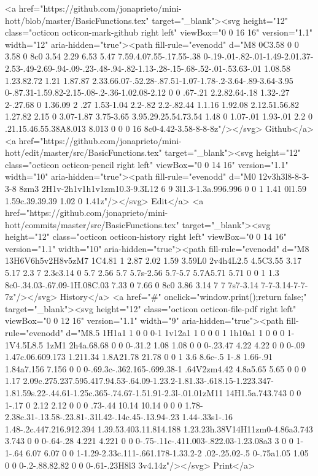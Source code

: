       <a href="https://github.com/jonaprieto/mini-hott/blob/master/BasicFunctions.tex" target="_blank"><svg height="12" class="octicon octicon-mark-github right left" viewBox="0 0 16 16" version="1.1" width="12" aria-hidden="true"><path fill-rule="evenodd" d="M8 0C3.58 0 0 3.58 0 8c0 3.54 2.29 6.53 5.47 7.59.4.07.55-.17.55-.38 0-.19-.01-.82-.01-1.49-2.01.37-2.53-.49-2.69-.94-.09-.23-.48-.94-.82-1.13-.28-.15-.68-.52-.01-.53.63-.01 1.08.58 1.23.82.72 1.21 1.87.87 2.33.66.07-.52.28-.87.51-1.07-1.78-.2-3.64-.89-3.64-3.95 0-.87.31-1.59.82-2.15-.08-.2-.36-1.02.08-2.12 0 0 .67-.21 2.2.82.64-.18 1.32-.27 2-.27.68 0 1.36.09 2 .27 1.53-1.04 2.2-.82 2.2-.82.44 1.1.16 1.92.08 2.12.51.56.82 1.27.82 2.15 0 3.07-1.87 3.75-3.65 3.95.29.25.54.73.54 1.48 0 1.07-.01 1.93-.01 2.2 0 .21.15.46.55.38A8.013 8.013 0 0 0 16 8c0-4.42-3.58-8-8-8z"/></svg> Github</a>
      <a href="https://github.com/jonaprieto/mini-hott/edit/master/src/BasicFunctions.tex" target="_blank"><svg height="12" class="octicon octicon-pencil right left" viewBox="0 0 14 16" version="1.1" width="10" aria-hidden="true"><path fill-rule="evenodd" d="M0 12v3h3l8-8-3-3-8 8zm3 2H1v-2h1v1h1v1zm10.3-9.3L12 6 9 3l1.3-1.3a.996.996 0 0 1 1.41 0l1.59 1.59c.39.39.39 1.02 0 1.41z"/></svg> Edit</a>
      <a href="https://github.com/jonaprieto/mini-hott/commits/master/src/BasicFunctions.tex" target="_blank"><svg height="12" class="octicon octicon-history right left" viewBox="0 0 14 16" version="1.1" width="10" aria-hidden="true"><path fill-rule="evenodd" d="M8 13H6V6h5v2H8v5zM7 1C4.81 1 2.87 2.02 1.59 3.59L0 2v4h4L2.5 4.5C3.55 3.17 5.17 2.3 7 2.3c3.14 0 5.7 2.56 5.7 5.7s-2.56 5.7-5.7 5.7A5.71 5.71 0 0 1 1.3 8c0-.34.03-.67.09-1H.08C.03 7.33 0 7.66 0 8c0 3.86 3.14 7 7 7s7-3.14 7-7-3.14-7-7-7z"/></svg> History</a>
      <a  href="#" onclick="window.print();return false;" target="_blank"><svg height="12" class="octicon octicon-file-pdf right left" viewBox="0 0 12 16" version="1.1" width="9" aria-hidden="true"><path fill-rule="evenodd" d="M8.5 1H1a1 1 0 0 0-1 1v12a1 1 0 0 0 1 1h10a1 1 0 0 0 1-1V4.5L8.5 1zM1 2h4a.68.68 0 0 0-.31.2 1.08 1.08 0 0 0-.23.47 4.22 4.22 0 0 0-.09 1.47c.06.609.173 1.211.34 1.8A21.78 21.78 0 0 1 3.6 8.6c-.5 1-.8 1.66-.91 1.84a7.156 7.156 0 0 0-.69.3c-.362.165-.699.38-1 .64V2zm4.42 4.8a5.65 5.65 0 0 0 1.17 2.09c.275.237.595.417.94.53-.64.09-1.23.2-1.81.33-.618.15-1.223.347-1.81.59s.22-.44.61-1.25c.365-.74.67-1.51.91-2.3l-.01.01zM11 14H1.5a.743.743 0 0 1-.17 0 2.12 2.12 0 0 0 .73-.44 10.14 10.14 0 0 0 1.78-2.38c.31-.13.58-.23.81-.31l.42-.14c.45-.13.94-.23 1.44-.33s1-.16 1.48-.2c.447.216.912.394 1.39.53.403.11.814.188 1.23.23h.38V14H11zm0-4.86a3.743 3.743 0 0 0-.64-.28 4.221 4.221 0 0 0-.75-.11c-.411.003-.822.03-1.23.08a3 3 0 0 1-1-.64 6.07 6.07 0 0 1-1.29-2.33c.111-.661.178-1.33.2-2 .02-.25.02-.5 0-.75a1.05 1.05 0 0 0-.2-.88.82.82 0 0 0-.61-.23H8l3 3v4.14z"/></svg> Print</a>
